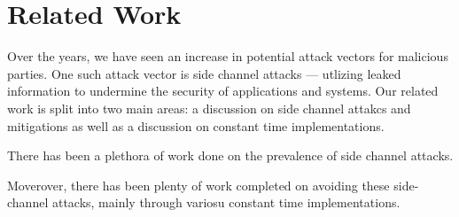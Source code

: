 \section{Related Work}
\label{sec:related}


Over the years, we have seen an increase in potential attack vectors for
malicious parties. One such attack vector is side channel attacks --- utlizing
leaked information to undermine the security of applications and systems.
Our related work is split into two main areas: a discussion on side channel
attakcs and mitigations as well as a discussion on constant time
implementations.

There has been a plethora of work done on the prevalence of side channel
attacks. 

Moverover, there has been plenty of work completed on avoiding these
side-channel attacks, mainly through variosu constant time implementations.

\cite{ocaml}
